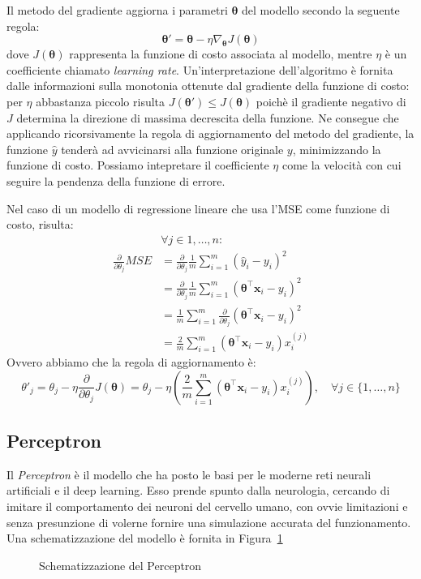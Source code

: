 Il metodo del gradiente aggiorna i parametri $\bm \theta$ del modello secondo
la seguente regola: 
\begin{equation} \label{eq:grad-up}
  \bm \theta' = \bm \theta - \eta \nabla_{\bm \theta} J(\bm \theta) 
\end{equation}
dove $J(\bm \theta)$ rappresenta la funzione di costo associata al modello,
mentre $\eta$ è un coefficiente chiamato \emph{learning rate}.
Un'interpretazione dell'algoritmo è fornita dalle informazioni sulla monotonia
ottenute dal gradiente della funzione di costo: per $\eta$ abbastanza piccolo
risulta $J(\bm \theta') \leq J(\bm \theta)$ poichè il gradiente negativo di $J$
determina la direzione di massima decrescita della funzione\cite{goodfellow}.
Ne consegue che applicando ricorsivamente la regola di aggiornamento del metodo
del gradiente, la funzione $\hat{y}$ tenderà ad avvicinarsi alla funzione
originale $y$, minimizzando la funzione di costo.  Possiamo intepretare il
coefficiente $\eta$ come la velocità con cui seguire la pendenza della funzione
di errore.

Nel caso di un modello di regressione lineare che usa l'MSE come funzione di
costo, risulta: 
\begin{align*}
  & \forall j \in {1, \dotsc, n}: \\
  \frac{\partial}{\partial\theta_j} MSE &= 
  \frac{\partial}{\partial\theta_j} \frac{1}{m} \sum_{i=1}^m{{(\hat{y}_i -
    y_i)}^2} \\ 
  &= \frac{\partial}{\partial\theta_j} \frac{1}{m}
  \sum_{i=1}^m{{(\bm \theta^\intercal \bm x_i - y_i)}^2} \\
  &= \frac{1}{m}
  \sum_{i=1}^m{\frac{\partial}{\partial\theta_j}{(\bm \theta^\intercal \bm x_i -
    y_i)}^2} \\
  &= \frac{2}{m}
  \sum_{i=1}^m{(\bm \theta^\intercal \bm x_i - y_i)x_i^{(j)}}
\end{align*}
%
Ovvero abbiamo che la regola di aggiornamento è:
\[ \theta'_j = \theta_j - \eta \frac{\partial}{\partial\theta_j} J(\bm \theta)
             = \theta_j - \eta (\frac{2}{m} 
             \sum_{i=1}^m{(\bm \theta^\intercal \bm x_i - y_i)x_i^{(j)}}),
             \quad \forall j \in \{1, \dotsc, n\}
           \]

\subsection{Perceptron}
Il \emph{Perceptron} è il modello che ha posto le basi per le moderne reti
neurali artificiali e il deep learning. Esso prende spunto dalla neurologia,
cercando di imitare il comportamento dei neuroni del cervello umano, con ovvie
limitazioni e senza presunzione di volerne fornire una simulazione accurata del
funzionamento. Una schematizzazione del modello è fornita in
Figura~\ref{fig:perceptron}
\begin{figure}[H]
  \caption{Schematizzazione del Perceptron}%
  \label{fig:perceptron}
\end{figure}

